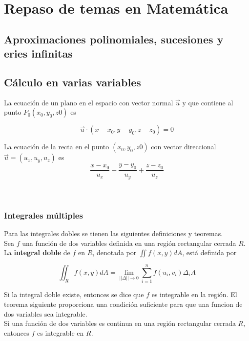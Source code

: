 \chapter{Repaso de temas en Matemática}

\section{Aproximaciones polinomiales, sucesiones y eries infinitas}

\section{Cálculo en varias variables}


La ecuación de un plano en el espacio con vector normal $\vec{u}$ y que contiene al punto $P_0(x_0,y_0,z0)$ es 

\begin{equation*}
\vec{u} \cdot (x-x_0,y-y_0,z-z_0) = 0
\end{equation*}

La ecuación de la recta en el punto $(x_0,y_0,z0)$ con vector direccional $\vec{u}=(u_x,u_y,u_z)$ es
\begin{equation*}
\frac{x-x_0}{u_x} +\frac{y-y_0}{u_y} +\frac{z-z_0}{u_z} 
\end{equation*} \\\

\subsection{Integrales múltiples}

Para las integrales dobles se tienen las siguientes definiciones y teoremas.\\

Sea $f$ una función de dos variables definida en una región rectangular cerrada $R$. La \textbf{integral doble} de $f$ en $R$, denotada por $\iint f(x,y) dA$, está definida por

\begin{equation*}
\iint_R f(x,y) dA = \lim_{||\Delta|| \to 0} \sum_{i=1}^{n} f(u_i,v_i)\Delta_i A
\end{equation*}

Si la integral doble existe, entonces se dice que $f$ es integrable en la región. El teorema siguiente proporciona una condición suficiente para que una funcion de dos variables sea integrable. \\

Si una función de dos variables es continua en una región rectangular cerrada $R$, entonces $f$ es integrable en $R$. 

